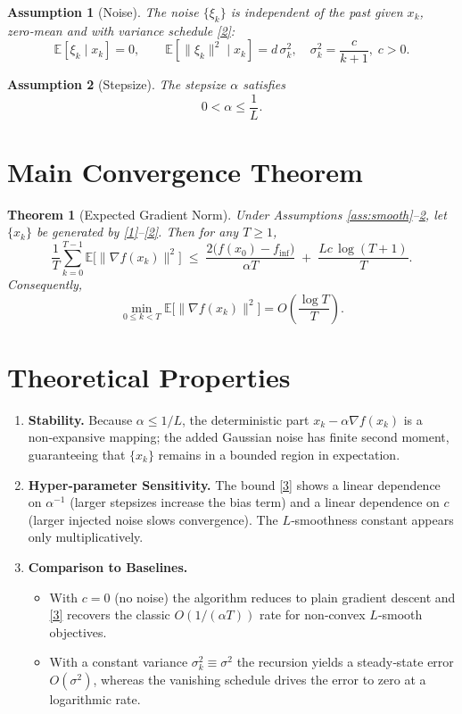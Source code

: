 \documentclass{article}
\newtheorem{theorem}{Theorem}
\newtheorem{assumption}{Assumption}
\newcommand{\E}{\mathbb{E}}
\begin{document}
\begin{assumption}[Noise]\label{ass:noise}
The noise $\{\xi_{k}\}$ is independent of the past given $x_{k}$, zero‑mean and with variance schedule \eqref{2}:
\[
\E[\xi_{k}\mid x_{k}]=0,\qquad
\E[\|\xi_{k}\|^{2}\mid x_{k}]=d\,\sigma_{k}^{2},\quad\sigma_{k}^{2}=\frac{c}{k+1},\;c>0.
\tag{A3}
\]
\end{assumption}

\begin{assumption}[Stepsize]\label{ass:step}
The stepsize $\alpha$ satisfies
\[
0<\alpha\le\frac{1}{L}.
\tag{A4}
\]
\end{assumption}

\section*{Main Convergence Theorem}
\begin{theorem}[Expected Gradient Norm]\label{thm:main}
Under Assumptions \ref{ass:smooth}–\ref{ass:step}, let $\{x_{k}\}$ be generated by \eqref{1}–\eqref{2}. Then for any $T\ge1$,
\[
\frac{1}{T}\sum_{k=0}^{T-1}\E\!\big[\|\nabla f(x_{k})\|^{2}\big]
\;\le\;
\frac{2\big(f(x_{0})-f_{\inf}\big)}{\alpha T}
\;+\;
\frac{L c\,\log (T+1)}{T}.
\tag{3}
\]
Consequently,
\[
\min_{0\le k<T}\E\!\big[\|\nabla f(x_{k})\|^{2}\big]
=O\!\left(\frac{\log T}{T}\right).
\]
\end{theorem}

\section*{Theoretical Properties}
\begin{enumerate}[label=\arabic*.]
\item \textbf{Stability.} Because $\alpha\le1/L$, the deterministic part $x_{k}-\alpha\nabla f(x_{k})$ is a non‑expansive mapping; the added Gaussian noise has finite second moment, guaranteeing that $\{x_{k}\}$ remains in a bounded region in expectation.
\item \textbf{Hyper‑parameter Sensitivity.} The bound \eqref{3} shows a linear dependence on $\alpha^{-1}$ (larger stepsizes increase the bias term) and a linear dependence on $c$ (larger injected noise slows convergence). The $L$‑smoothness constant appears only multiplicatively.
\item \textbf{Comparison to Baselines.}
\begin{itemize}
\item With $c=0$ (no noise) the algorithm reduces to plain gradient descent and \eqref{3} recovers the classic $O(1/(\alpha T))$ rate for non‑convex $L$‑smooth objectives.
\item With a constant variance $\sigma_{k}^{2}\equiv\sigma^{2}$ the recursion yields a steady‑state error $O(\sigma^{2})$, whereas the vanishing schedule drives the error to zero at a logarithmic rate.
\end{itemize}
\end{enumerate}
\end{document}
